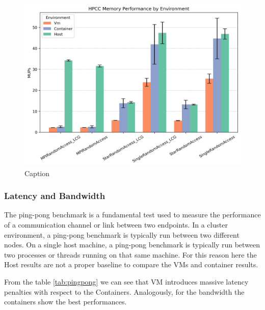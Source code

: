 \begin{figure}[H]
    \centering
    \includegraphics[width=0.8\linewidth]{assets/hpcc_memory_performance.png}
    \caption{Caption}
    \label{fig:enter-label}
\end{figure}

\subsubsection{Latency and Bandwidth}

The ping-pong benchmark is a fundamental test used to measure the performance of a communication channel or link between two endpoints.
In a cluster environment, a ping-pong benchmark is typically run between two different nodes. On a single host machine, a ping-pong benchmark is typically run between two processes or threads running on that same machine. For this reason here the Host results are not a proper baseline to compare the VMs and container results.

From the table \ref{tab:pingpong} we can see that VM introduces massive latency penalties with respect to the Containers. Analogously, for the bandwidth the containers show the best performances.

